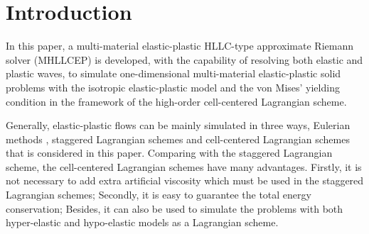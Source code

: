 \documentclass[review]{elsarticle}
\begin{document}
\section{Introduction}

In this paper, a multi-material elastic-plastic HLLC-type \cite{toro1994restoration} approximate Riemann solver (MHLLCEP) is developed, with the capability of resolving both elastic and plastic waves, to simulate one-dimensional  multi-material elastic-plastic solid problems with the isotropic elastic-plastic model \cite{wilkins1963calculation} and  the von Mises' yielding condition in the framework of the  high-order cell-centered Lagrangian scheme.

Generally, elastic-plastic flows can be mainly simulated in three ways, Eulerian methods \cite{trangenstein1991higher,miller2001high,barton2009exact,liu2008modified}, staggered Lagrangian schemes \cite{wilkins1963calculation} and cell-centered Lagrangian schemes \cite{burton2013cell,kluth2010discretization,maire2013nominally,cheng2017third} that  is considered in this paper. Comparing with the staggered Lagrangian scheme, the cell-centered Lagrangian  schemes  have many advantages. Firstly, it is  not necessary to add  extra artificial viscosity  which  must be used in the staggered Lagrangian schemes; Secondly, it is easy to guarantee the total energy conservation; Besides, it can also be used to simulate the problems with both  hyper-elastic and hypo-elastic models  \cite{burton2013cell,kluth2010discretization,maire2013nominally,cheng2017third}  as a Lagrangian scheme.
\end{document}
